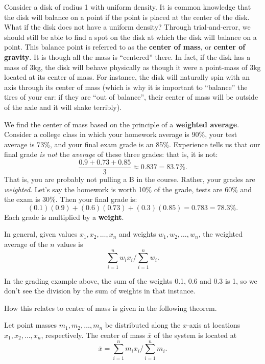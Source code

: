 Consider a disk of radius 1 with uniform density. It is common knowledge that the disk will balance on a point if the point is placed at the center of the disk. What if the disk does not have a uniform density? Through trial-and-error, we should still be able to find a spot on the disk at which the disk will balance on a point. This balance point is referred to as the \textbf{center of mass}, or \textbf{center of gravity}. It is though all the mass is ``centered'' there. In fact, if the disk has a mass of 3kg, the disk will behave physically as though it were a point-mass of 3kg located at its center of mass. For instance, the disk will naturally spin with an axis through its center of mass (which is why it is important to ``balance'' the tires of your car: if they are ``out of balance'', their center of mass will be outside of the axle and it will shake terribly).

We find the center of mass based on the principle of a \textbf{weighted average}. Consider a college class in which your homework average is 90\%, your test average is 73\%, and your final exam grade is an 85\%. Experience tells us that our final grade \textit{is not} the \textit{average} of these three grades: that is, it is not:
$$\frac{0.9+0.73+0.85}{3} \approx 0.837 = 83.7\text{\%}.$$
That is, you are probably not pulling a B in the course. Rather, your grades are \textit{weighted}. Let's say the homework is worth 10\% of the grade, tests are 60\% and the exam is 30\%. Then your final grade is:
$$(0.1)(0.9) + (0.6)(0.73)+(0.3)(0.85) = 0.783 = 78.3\text{\%}.$$
Each grade is multiplied by a \textbf{weight}. 

In general, given values $x_1,x_2,\ldots,x_n$ and weights $w_1,w_2,\ldots,w_n$, the weighted average of the $n$ values is
$$\sum_{i=1}^n w_ix_i\Bigg/\sum_{i=1}^n w_i.$$

In the grading example above, the sum of the weights 0.1, 0.6 and 0.3 is 1, so we don't see the division by the sum of weights in that instance.

How this relates to center of mass is given in the following theorem.

{Let point masses $m_1,m_2,\ldots,m_n$ be distributed along the $x$-axis at locations $x_1,x_2,\ldots,x_n$, respectively. The center of mass $\overline{x}$ of the system is located at
$$\overline{x} = \sum_{i=1}^nm_ix_i\Bigg/\sum_{i=1}^n m_i.$$
}

